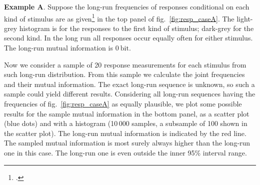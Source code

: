 \documentclass[\ifafour a4paper,12pt,\else a5paper,10pt,\fi%
onecolumn,oneside,article,%
british%
]{memoir}
\theoremstyle{remark}
\theoremstyle{innote}
\newcommand*{\citep}{\footcites}
\renewcommand*{\|}[1][]{\nonscript\,#1\vert\nonscript\;\mathopen{}}
\newcommand*{\fig}{fig.}%
\newcommand*{\bit}{\mathrm{bit}}
\begin{document}
\textbf{Example A}. Suppose the long-run frequencies of responses conditional
on each kind of stimulus are as given\citep[as the example
in][]{panzerietal2007} in the top panel of \fig~\ref{fig:resp_caseA}. The
light-grey histogram is for the responses to the first kind of stimulus;
dark-grey for the second kind. In the long run all responses occur equally
often for either stimulus. The long-run mutual information is $0\:\bit$.

Now we consider a sample of 20 response measurements for each stimulus from
such long-run distribution. From this sample we calculate the joint
frequencies and their mutual information. The exact long-run sequence is
unknown, so such a sample could yield different results. Considering all
long-run sequences having the frequencies of \fig~\ref{fig:resp_caseA} as
equally plausible, we plot some possible results for the sample mutual
information in the bottom panel, as a scatter plot (blue dots) and with a
histogram (10\,000 samples, a subsample of 100 shown in the scatter plot).
The long-run mutual information is indicated by the red line. The sampled
mutual information is most surely always higher than the long-run one in
this case. The long-run one is even outside the inner 95\% interval range.

\clearpage
\end{document}
